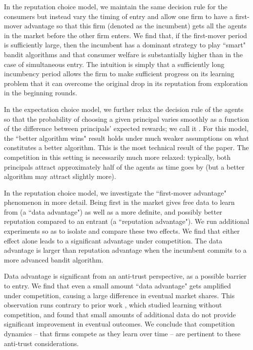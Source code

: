 {In the reputation choice model, we maintain the same decision rule for the consumers but instead vary the timing of entry and allow one firm to have a first-mover advantage so that this firm (denoted as the incumbent) gets all the agents in the market before the other firm enters. We find that, if the first-mover period is sufficiently large, then the incumbent has a dominant strategy to play ``smart" bandit algorithms and that consumer welfare is substantially higher than in the case of simultaneous entry. The intuition is simply that a sufficiently long incumbency period allows the firm to make sufficient progress on its learning problem that it can overcome the original drop in its reputation from exploration in the beginning rounds.

 In the expectation choice model, we further relax the decision rule of the agents so that the probability of choosing a given principal varies smoothly as a function of the difference between  principals' expected rewards; we call it \SoftMaxRandom. For this model, the ``better algorithm wins" result holds under much weaker assumptions on what constitutes a better algorithm. This is the most technical result of the paper. The competition in this setting is necessarily much more relaxed: typically, both principals attract approximately half of the agents as time goes by (but a better algorithm may attract slightly more).

In the reputation choice model, we investigate the ``first-mover advantage" phenomenon in more detail. Being first in the market gives free data to learn from (a ``data advantage") as well as a more definite, and possibly better reputation compared to an entrant (a ``reputation advantage"). We run additional experiments so as to isolate and compare these two effects. We find that either effect alone leads to a significant advantage under competition. The data advantage is larger than reputation advantage when the incumbent commits to a more advanced bandit algorithm.

Data advantage is significant from an anti-trust perspective, as a possible barrier to entry. We find that even a small amount ``data advantage" gets amplified under competition, causing a large difference in eventual market shares. This observation runs contrary to prior work  \cite{lambrecht2015can,bajari2018impact}, which studied learning without competition, and found that small amounts of additional data do not provide significant improvement in eventual outcomes. We conclude that competition dynamics -- that firms compete as they learn over time -- are pertinent to these anti-trust considerations.

}
